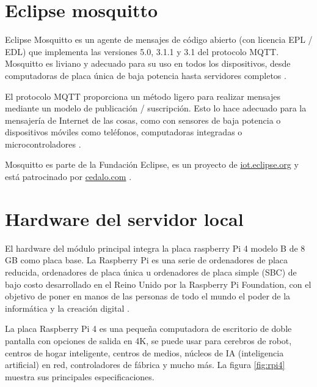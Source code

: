 \section{Eclipse mosquitto} 
Eclipse Mosquitto es un agente de mensajes de código abierto (con licencia EPL / EDL) que implementa las versiones 5.0, 3.1.1 y 3.1 del protocolo MQTT. Mosquitto es liviano y adecuado para su uso en todos los dispositivos, desde computadoras de placa única de baja potencia hasta servidores completos \citep{WEBSITE:5}.

El protocolo MQTT proporciona un método ligero para realizar mensajes mediante un modelo de publicación / suscripción. Esto lo hace adecuado para la mensajería de Internet de las cosas, como con sensores de baja potencia o dispositivos móviles como teléfonos, computadoras integradas o microcontroladores \citep{WEBSITE:5}.

Mosquitto es parte de la Fundación Eclipse, es un proyecto de \url{iot.eclipse.org} y está patrocinado por \url{cedalo.com} \citep{WEBSITE:5}. 

\section{Hardware del servidor local} 

El hardware del módulo principal integra la placa raspberry Pi 4 modelo B de 8 GB como placa base. La Raspberry Pi es una serie de ordenadores de placa reducida, ordenadores de placa única u ordenadores de placa simple (SBC) de bajo costo desarrollado en el Reino Unido por la Raspberry Pi Foundation, con el objetivo de poner en manos de las personas de todo el mundo el poder de la informática y la creación digital \citep{WEBSITE:6}.

La placa Raspberry Pi 4 es una pequeña computadora de escritorio de doble pantalla con opciones de salida en 4K, se puede usar para cerebros de robot, centros de hogar inteligente, centros de medios, núcleos de IA (inteligencia artificial) en red, controladores de fábrica y mucho más. La figura \ref{fig:rpi4} muestra sus principales especificaciones.

\vspace{0.5cm}

